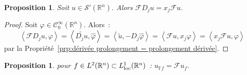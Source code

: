 \documentclass{report}
\newcommand{\R}{{\mathbb R}}
\newcommand{\scpr}[2]{\left\langle#1, #2\right\rangle}
\newcommand{\loc}{{\text{\textnormal{loc}}}}
\newtheorem{prp}[thm]{Proposition}
\theoremstyle{definition}
\theoremstyle{remark}
\begin{document}
\begin{prp} Soit $u \in \mathcal S'(\R^n)$. Alors $\mathcal FD_ju = x_j\mathcal Fu$.
\end{prp}

\begin{proof} Soit $\varphi \in \mathcal C^\infty_0(\R^n)$. Alors~:
\[\scpr {\mathcal FD_ju}\varphi = \scpr {\widetilde {D_ju}}{\widehat \varphi} = \scpr {\widetilde u}{-D_j\widehat \varphi} = \scpr {\mathcal Fu}{x_j\varphi}
= \scpr {x_j\mathcal Fu}\varphi\]
par la Propriété~\ref{prp:dérivée prolongement = prolongement dérivée}.
\end{proof}

\begin{prp}\label{prp:Fourier distributions L1} pour $f \in L^2(\R^n) \subset L^1_\loc(\R^n)$~: $u_{\mathbb Ff} = \mathcal Fu_f$.
\end{prp}
\end{document}
